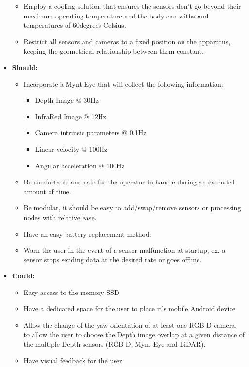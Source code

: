 \begin{itemize}
\begin{itemize}
        \item Employ a cooling solution that ensures the sensors don't go beyond their maximum operating temperature and the body can withstand temperatures of 60degrees Celsius.
        \item Restrict all sensors and cameras to a fixed position on the apparatus, keeping the geometrical relationship between them constant.
    \end{itemize}
    \item \textbf{Should:}
    \begin{itemize}
        \item Incorporate a Mynt Eye that will collect the following information:
        \begin{itemize}
            \item Depth Image @ 30Hz
            \item InfraRed Image @ 12Hz
            \item Camera intrinsic parameters @ 0.1Hz
            \item Linear velocity @ 100Hz
            \item Angular acceleration @ 100Hz
        \end{itemize}    
        \item Be comfortable and safe for the operator to handle during an extended amount of time.
        \item Be modular, it should be easy to add/swap/remove sensors or processing nodes with relative ease.
        \item Have an easy battery replacement method.
        \item Warn the user in the event of a sensor malfunction at startup, ex. a sensor stops sending data at the desired rate or goes offline.
    \end{itemize}
    \item \textbf{Could:}
    \begin{itemize}   
        \item Easy access to the memory SSD
        \item Have a dedicated space for the user to place it's mobile Android device
        \item Allow the change of the yaw orientation of at least one RGB-D camera, to allow the user to choose the Depth image overlap at a given distance of the multiple Depth sensors (RGB-D, Mynt Eye and LiDAR).
        \item Have visual feedback for the user.
    \end{itemize}

\end{itemize}
